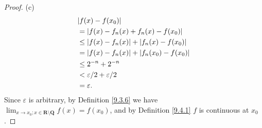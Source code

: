 \begin{proof}{(c)}
\begin{align*}
         & \abs*{f(x) - f(x_0)}                               \\
         & = \abs*{f(x) - f_n(x) + f_n(x) - f(x_0)}           \\
         & \leq \abs*{f(x) - f_n(x)} + \abs*{f_n(x) - f(x_0)} \\
         & = \abs*{f(x) - f_n(x)} + \abs*{f_n(x_0) - f(x_0)}  \\
         & \leq 2^{-n} + 2^{-n}                               \\
         & < \varepsilon / 2 + \varepsilon / 2                \\
         & = \varepsilon.
    \end{align*}
    Since \(\varepsilon\) is arbitrary, by Definition \ref{9.3.6} we have \(\lim_{x \to x_0 ; x \in \mathbf{R} \setminus \mathbf{Q}} f(x) = f(x_0)\), and by Definition \ref{9.4.1} \(f\) is continuous at \(x_0\).
\end{proof}